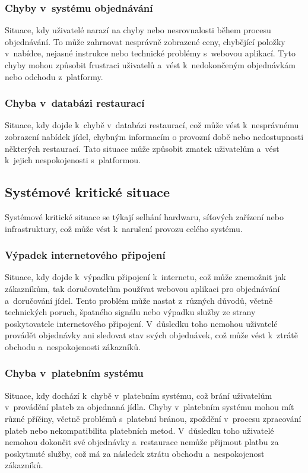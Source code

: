         \subsubsection{Chyby v~systému objednávání} 
        Situace, kdy uživatelé narazí na chyby nebo nesrovnalosti během procesu objednávání. To může zahrnovat nesprávně zobrazené ceny, chybějící položky v~nabídce, nejasné instrukce nebo technické problémy s~webovou aplikací. Tyto chyby mohou způsobit frustraci uživatelů a~vést k~nedokončeným objednávkám nebo odchodu z~platformy.

        \subsubsection{Chyba v~databázi restaurací} 
        Situace, kdy dojde k~chybě v~databázi restaurací, což může vést k~nesprávnému zobrazení nabídek jídel, chybným informacím o provozní době nebo nedostupnosti některých restaurací. Tato situace může způsobit zmatek uživatelům a~vést k~jejich nespokojenosti s~platformou.

    \subsection{Systémové kritické situace}
    
    Systémové kritické situace se týkají selhání hardwaru, síťových zařízení nebo infrastruktury, což může vést k~narušení provozu celého systému.
    
        \subsubsection{Výpadek internetového připojení} 
        Situace, kdy dojde k~výpadku připojení k~internetu, což může znemožnit jak zákazníkům, tak doručovatelům používat webovou aplikaci pro objednávání a~doručování jídel. Tento problém může nastat z~různých důvodů, včetně technických poruch, špatného signálu nebo výpadku služby ze strany poskytovatele internetového připojení. V~důsledku toho nemohou uživatelé provádět objednávky ani sledovat stav svých objednávek, což může vést k~ztrátě obchodu a~nespokojenosti zákazníků.

        \subsubsection{Chyba v~platebním systému} 
        Situace, kdy dochází k~chybě v~platebním systému, což brání uživatelům v~provádění plateb za objednaná jídla. Chyby v~platebním systému mohou mít různé příčiny, včetně problémů s~platební bránou, zpoždění v~procesu zpracování plateb nebo nekompatibilita platebních metod. V~důsledku toho uživatelé nemohou dokončit své objednávky a~restaurace nemůže přijmout platbu za poskytnuté služby, což má za následek ztrátu obchodu a~nespokojenost zákazníků.

